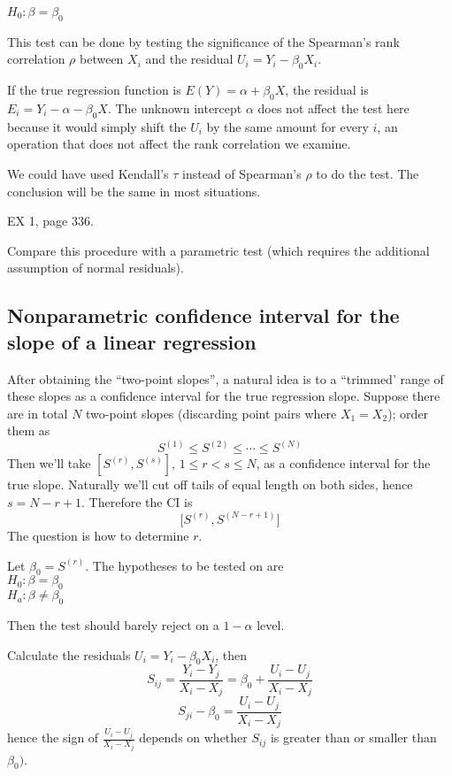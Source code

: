 \documentclass[12pt]{article}
\begin{document}
$H_0: \beta = \beta_0$

This test can be done by testing
the significance of the Spearman's rank correlation $\rho$
between $X_i$ and the residual $U_i = Y_i - \beta_0 X_i$.

\alert%
If the true regression function is
$E(Y) = \alpha + \beta_0X$,
the residual is
$E_i = Y_i - \alpha - \beta_0X$.
The unknown intercept $\alpha$ does not affect the test here because
it would simply shift the $U_i$ by the same amount for every $i$,
an operation that does not affect the rank correlation we examine.

\alert We could have used Kendall's $\tau$ instead of Spearman's $\rho$
to do the test. The conclusion will be the same in most situations.

\example EX 1, page 336.

\exercise Compare this procedure with a parametric test (which requires
the additional assumption of normal residuals).

\subsection{Nonparametric confidence interval for the slope of a linear
    regression}

After obtaining the ``two-point slopes'',
a natural idea is to a ``trimmed' range of these slopes
as a confidence interval for the true regression slope.
Suppose there are in total $N$ two-point slopes (discarding
point pairs where $X_1 = X_2$); order them as
\[
S^{(1)} \le S^{(2)} \le \dotsb \le S^{(N)}
\]
Then we'll take
$[S^{(r)}, S^{(s)}]$,
$1 \le r < s \le N$, as a confidence interval for the true slope.
Naturally we'll cut off tails of equal length on both sides,
hence $s = N - r + 1$.
Therefore the CI is
\[
\bigl[S^{(r)}, S^{(N-r+1)}\bigr]
\]
The question is how to determine $r$.

Let $\beta_0 = S^{(r)}$.
The hypotheses to be tested on are\\
$H_0: \beta = \beta_0$\\
$H_a: \beta \ne \beta_0$

Then the test should barely reject on a $1 - \alpha$ level.

Calculate the residuals
$U_i = Y_i - \beta_0X_i$, then
\[
S_{ij}
= \frac{Y_i - Y_j}{X_i - X_j}
= \beta_0 + \frac{U_i - U_j}{X_i - X_j}
\]
\ie
\[
S_{ji} - \beta_0 = \frac{U_i - U_j}{X_i - X_j}
\]
hence the sign of $\frac{U_i - U_j}{X_i - X_j}$
depends on whether $S_{ij}$ is greater than or smaller than $\beta_0)$.
\end{document}
